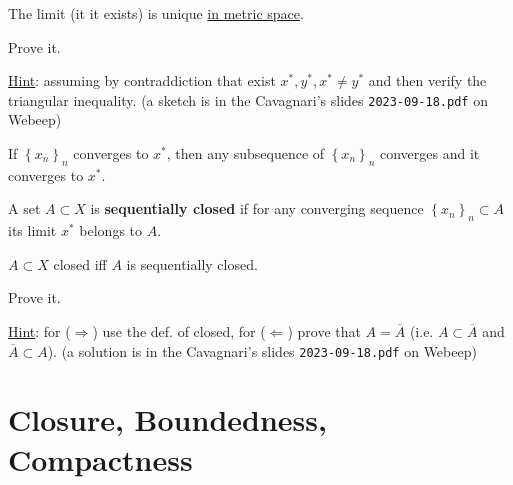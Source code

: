 \begin{prp}
The limit (it it exists) is unique \underline{in metric space}.
\end{prp}

\begin{home}
Prove it.

\underline{Hint}: assuming by contraddiction that exist $x^*,y^*,x^*\neq y^*$ and then verify the triangular inequality.
\newline
\newline
\newline
\newline
\newline
\newline
(a sketch is in the Cavagnari's slides \texttt{2023-09-18.pdf} on Webeep)
\end{home}

\begin{prp}
If $\left\{ x_n \right\}_{n}$ converges to $x^*$, then any subsequence of $\left\{ x_n \right\}_{n}$ converges and it converges to $x^*$.
\end{prp}

\begin{defn}
A set $A\subset X$ is \textbf{sequentially closed} if for any converging sequence $\left\{ x_n \right\}_{n}\subset A$ its limit $x^*$ belongs to $A$.
\end{defn}

\begin{prp}
$A\subset X$ closed iff $A$ is sequentially closed.
\end{prp}

\begin{home}
Prove it.

\underline{Hint}: for ($\Rightarrow$) use the def. of closed, for ($\Leftarrow$) prove that $A=\overline{A}$ (i.e. $A\subset\overline{A}$ and $\overline{A}\subset A$).
\newline
\newline
\newline
\newline
\newline
\newline
(a solution is in the Cavagnari's slides \texttt{2023-09-18.pdf} on Webeep)
\end{home}


\newpage

\section{Closure, Boundedness, Compactness} %
\label{sec:closure_boundedness_compactness}

